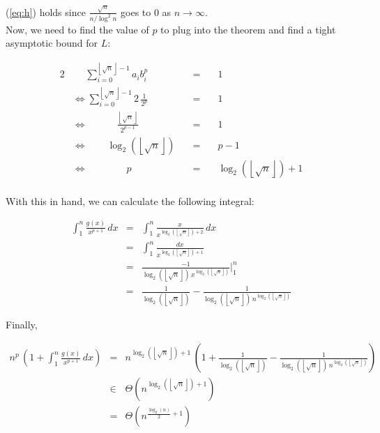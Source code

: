 \documentclass[a4paper,10pt]{article}
\newcommand{\floor}[1]{\ensuremath{\left\lfloor #1 \right\rfloor}}
\begin{document}
(\ref{eq:h}) holds since $\frac{\sqrt{n}}{n / \log^2{n}}$ goes to $0$ as $n \rightarrow  \infty$.\\

Now, we need to find the value of $p$ to plug into the theorem and find a tight asymptotic bound for $L$:

\begin{alignat*}{2}
    &\quad \,\, \displaystyle \sum_{i = 0}^{\floor{\sqrt{n}} - 1}{a_i b_i^p} \quad &= & \quad 1 \\ 
    &\Leftrightarrow \displaystyle \sum_{i = 0}^{\floor{\sqrt{n}} - 1}{2 \, \frac{1}{2^p}} \quad &=& \quad 1 \\
    &\Leftrightarrow  \quad\quad\quad \frac{\floor{\sqrt{n}}}{2^{p-1}}\quad &=& \quad 1 \\
    &\Leftrightarrow  \quad\quad \log_2\left(\floor{\sqrt{n}}\right) \quad &=& \quad p - 1 \\
    &\Leftrightarrow  \quad\quad\quad\quad p \quad &=& \quad \log_2\left(\floor{\sqrt{n}}\right) + 1 \\
\end{alignat*}

With this in hand, we can calculate the following integral:

\begin{eqnarray*}
    \int_{1}^{n}{\frac{g(x)}{x^{p+1}} \, dx} &=& \int_{1}^{n}{\frac{x}{x^{\log_2\left(\floor{\sqrt{n}}\right) + 2}} \, dx} \\
    &=& \int_{1}^{n}{\frac{dx}{x^{\log_2\left(\floor{\sqrt{n}}\right) + 1}}} \\
    &=& \frac{-1}{\log_2\left(\floor{\sqrt{n}}\right) \, x^{\log_2\left(\floor{\sqrt{n}}\right)}} \bigg\rvert_{1}^{n} \\
    &=& \frac{1}{\log_2\left(\floor{\sqrt{n}}\right)} - \frac{1}{\log_2\left(\floor{\sqrt{n}}\right) \, n^{\log_2\left(\floor{\sqrt{n}}\right)}}
\end{eqnarray*}

Finally,

\begin{eqnarray*}
    n^p \, \left(1 + \int_{1}^{n}{\frac{g(x)}{x^{p+1}} \, dx}\right) &=& n^{\log_2\left(\floor{\sqrt{n}}\right) + 1} \,
                                                                         \left(1 + \frac{1}{\log_2\left(\floor{\sqrt{n}}\right)}
                                                                         - \frac{1}{\log_2\left(\floor{\sqrt{n}}\right) \, n^{\log_2\left(\floor{\sqrt{n}}\right)}}
                                                                         \right) \\
    &\in& \Theta \left(n^{\log_2\left(\floor{\sqrt{n}}\right) + 1}\right) \\
    &=& \Theta \left(n^{\frac{\log_2(n)}{2} + 1} \right)
\end{eqnarray*}
\end{document}
